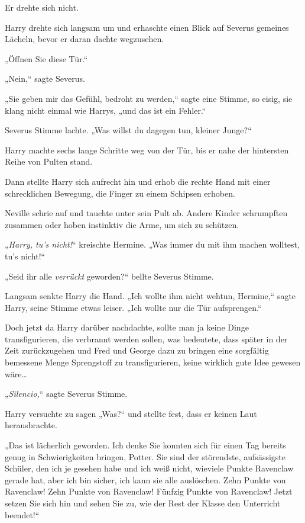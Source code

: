 {Er drehte sich nicht.

Harry drehte sich langsam um und erhaschte einen Blick auf Severus gemeines Lächeln, bevor er daran dachte wegzusehen.

„Öffnen Sie diese Tür.“

„Nein,“ sagte Severus.

„Sie geben mir das Gefühl, bedroht zu werden,“ sagte eine Stimme, so eisig, sie klang nicht einmal wie Harrys, „und das ist ein Fehler.“

Severus Stimme lachte. „Was willst du dagegen tun, kleiner Junge?“

Harry machte sechs lange Schritte weg von der Tür, bis er nahe der hintersten Reihe von Pulten stand.

Dann stellte Harry sich aufrecht hin und erhob die rechte Hand mit einer schrecklichen Bewegung, die Finger zu einem Schipsen erhoben.

Neville schrie auf und tauchte unter sein Pult ab. Andere Kinder schrumpften zusammen oder hoben instinktiv die Arme, um sich zu schützen.

„\emph{Harry, tu's nicht!}“ kreischte Hermine. „Was immer du mit ihm machen wolltest, tu's nicht!“

„Seid ihr alle \emph{verrückt} geworden?“ bellte Severus Stimme.

Langsam senkte Harry die Hand. „Ich wollte ihm nicht wehtun, Hermine,“ sagte Harry, seine Stimme etwas leiser. „Ich wollte nur die Tür aufsprengen.“

Doch jetzt da Harry darüber nachdachte, sollte man ja keine Dinge transfigurieren, die verbrannt werden sollen, was bedeutete, dass später in der Zeit zurückzugehen und Fred und George dazu zu bringen eine sorgfältig bemessene Menge Sprengstoff zu transfigurieren, keine wirklich gute Idee gewesen wäre…

„\emph{Silencio,}“ sagte Severus Stimme.

Harry versuchte zu sagen „Was?“ und stellte fest, dass er keinen Laut herausbrachte.

„Das ist lächerlich geworden. Ich denke Sie konnten sich für einen Tag bereits genug in Schwierigkeiten bringen, Potter. Sie sind der störendste, aufsässigste Schüler, den ich je gesehen habe und ich weiß nicht, wieviele Punkte Ravenclaw gerade hat, aber ich bin sicher, ich kann sie alle auslöschen. Zehn Punkte von Ravenclaw! Zehn Punkte von Ravenclaw! Fünfzig Punkte von Ravenclaw! Jetzt setzen Sie sich hin und sehen Sie zu, wie der Rest der Klasse den Unterricht beendet!“

}
